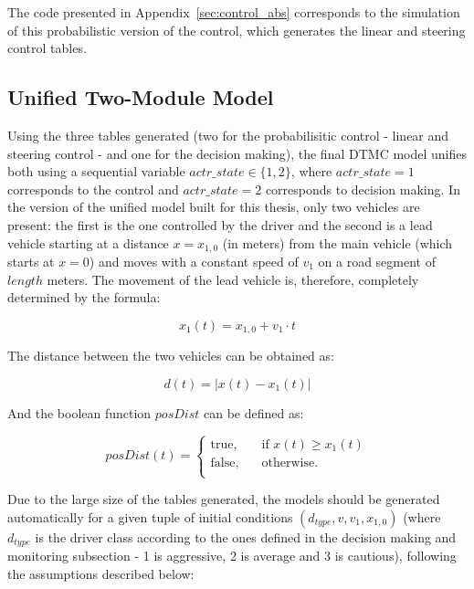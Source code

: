 The code presented in Appendix~\ref{sec:control_abs} corresponds to the simulation of this probabilistic version of the control, which generates the linear and steering control tables.

\subsection{Unified Two-Module Model}

Using the three tables generated (two for the probabilisitic control - linear and steering control - and one for the decision making), the final DTMC model unifies both using a sequential variable $actr\_state \in \{1,2\}$, where $actr\_state = 1$ corresponds to the control and $actr\_state = 2$ corresponds to decision making. In the version of the unified model built for this thesis, only two vehicles are present: the first is the one controlled by the driver and the second is a lead vehicle starting at a distance $x = x_{1,0}$ (in meters) from the main vehicle (which starts at $x=0$) and moves with a constant speed of $v_1$ on a road segment of $length$ meters. The movement of the lead vehicle is, therefore, completely determined by the formula:

\begin{equation}
	x_1(t) = x_{1,0} + v_1\cdot t
\end{equation}

The distance between the two vehicles can be obtained as:

\begin{equation}
	d(t) = \lvert x(t) - x_1(t) \rvert
\end{equation}

And the boolean function $posDist$ can be defined as:

\begin{equation}
posDist(t) = 
     \begin{cases}
       \text{true,} &\quad\text{if }x(t) \geq x_1(t)\\
       \text{false,} &\quad\text{otherwise.} \\
     \end{cases}
\end{equation}

Due to the large size of the tables generated, the models should be generated automatically for a given tuple of initial conditions $(d_{type}, v, v_1, x_{1,0})$ (where $d_{type}$ is the driver class according to the ones defined in the decision making and monitoring subsection - 1 is aggressive, 2 is average and 3 is cautious), following the assumptions described below:

